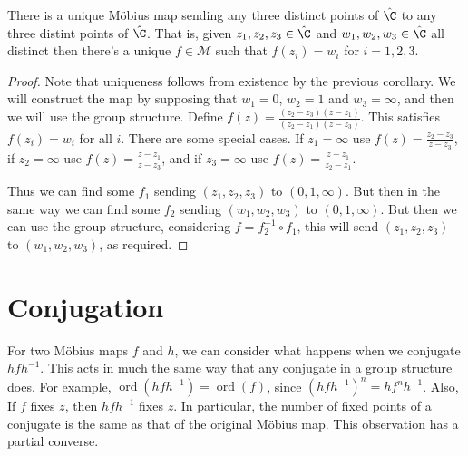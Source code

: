 \documentclass[a4]{scrreprt}
\begin{document}
\begin{theorem}
	There is a unique Möbius map sending any three distinct points of $\hat{\C}$ to any three distint points of $\hat{\C}$. That is, given $z_1, z_2, z_3 \in \hat{\C}$ and $w_1, w_2, w_3 \in \hat{\C}$ all distinct then there's a unique $f \in \mathcal{M}$ such that $f(z_i) = w_i$ for $i = 1, 2, 3$. 
\end{theorem}
\begin{proof}
	Note that uniqueness follows from existence by the previous corollary. We will construct the map by supposing that $w_1 = 0$, $w_2 = 1$ and $w_3 = \infty$, and then we will use the group structure.
	Define $f(z) = \frac{(z_2 - z_3)(z - z_1)}{(z_2 - z_1)(z - z_3)}$. This satisfies $f(z_i) = w_i$ for all $i$. There are some special cases. If $z_1 = \infty$ use $f(z) = \frac{z_2 - z_3}{z - z_3}$, if $z_2 = \infty$ use $f(z) = \frac{z - z_1}{z - z_3}$, and if $z_3 = \infty$ use $f(z) = \frac{z - z_1}{z_2 - z_1}$.

	Thus we can find some $f_1$ sending $(z_1, z_2, z_3)$ to $(0, 1, \infty)$. But then in the same way we can find some $f_2$ sending $(w_1, w_2, w_3)$ to $(0, 1, \infty)$. But then we can use the group structure, considering $f = f_2^{-1} \circ f_1$, this will send $(z_1, z_2, z_3)$ to $(w_1, w_2, w_3)$, as required.
\end{proof}

\section{Conjugation}

For two Möbius maps $f$ and $h$, we can consider what happens when we conjugate $h fh^{-1}$. This acts in much the same way that any conjugate in a group structure does. For example, $\operatorname{ord}(hfh^{-1}) = \operatorname{ord}(f)$, since $(hfh^{-1})^{n} = hf^{n} h^{-1}$. Also, If $f$ fixes $z$, then $h fh^{-1}$ fixes $z$. In particular, the number of fixed points of a conjugate is the same as that of the original Möbius map. This observation has a partial converse.
\end{document}
